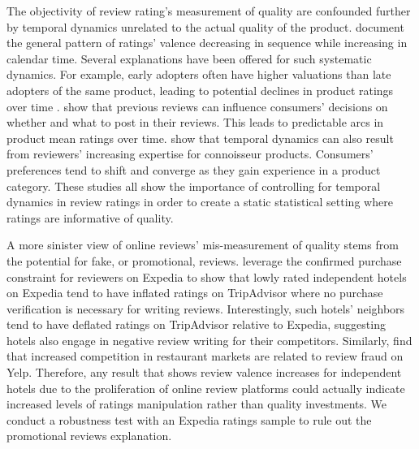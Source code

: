 \documentclass[12pt, leqno]{article}
\begin{document}
The objectivity of review rating's measurement of quality are confounded further by temporal dynamics unrelated to the actual quality of the product. \citet{godes2012sequential} document the general pattern of ratings' valence decreasing in sequence while increasing in calendar time. Several explanations have been offered for such systematic dynamics. For example, early adopters often have higher valuations than late adopters of the same product, leading to potential declines in product ratings over time \citep{li2008self}. \citet{moe2012online} show that previous reviews can influence consumers' decisions on whether and what to post in their reviews. This leads to predictable arcs in product mean ratings over time. \citet{mcauley2013amateurs} show that temporal dynamics can also result from reviewers' increasing expertise for connoisseur products. Consumers' preferences tend to shift and converge as they gain experience in a product category. These studies all show the importance of controlling for temporal dynamics in review ratings in order to create a static statistical setting where ratings are informative of quality.

A more sinister view of online reviews' mis-measurement of quality stems from the potential for fake, or promotional, reviews. \citet{mayzlin2014promotional} leverage the confirmed purchase constraint for reviewers on Expedia to show that lowly rated independent hotels on Expedia tend to have inflated ratings on TripAdvisor where no purchase verification is necessary for writing reviews. Interestingly, such hotels' neighbors tend to have deflated ratings on TripAdvisor relative to Expedia, suggesting hotels also engage in negative review writing for their competitors. Similarly, \citet{luca2016fake} find that increased competition in restaurant markets are related to review fraud on Yelp. Therefore, any result that shows review valence increases for independent hotels due to the proliferation of online review platforms could actually indicate increased levels of ratings manipulation rather than quality investments. We conduct a robustness test with an Expedia ratings sample to rule out the promotional reviews explanation.
\end{document}
